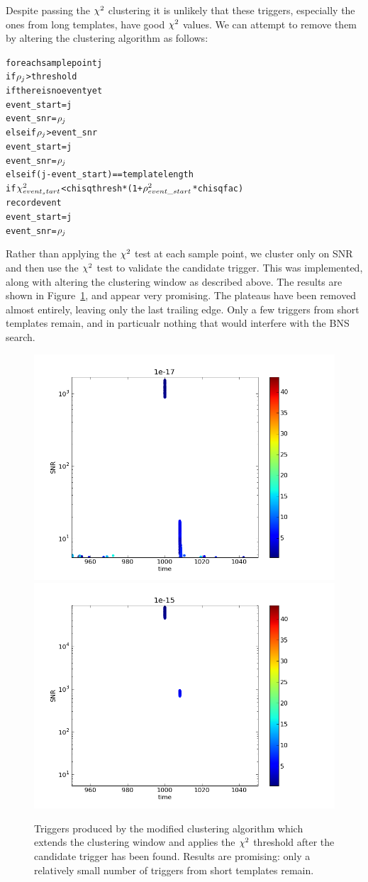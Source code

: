 Despite passing the $\chi^2$ clustering it is unlikely that these
triggers, especially the ones from long templates, have good $\chi^2$
values.  We can attempt to remove them by altering the clustering
algorithm as follows:


\begin{alltt}
for each sample point j
  if \(\rho\sb{j}\) > threshold
    if there is no event yet
      event\_start = j
      event\_snr   = \(\rho\sb{j}\)
    else if \(\rho\sb{j}\) > event\_snr
      event\_start = j
      event\_snr = \(\rho\sb{j}\)
    else if (j - event\_start) == template length
      if \(\chisq\sb{event_start}\) < chisq thresh * ( 1 + \(\rho\sp{2}\sb{event\_start}\) * chisqfac )
        record event
      event\_start = j
      event\_snr   = \(\rho\sb{j}\)
\end{alltt}

Rather than applying the $\chi^2$ test at each sample point, we
cluster only on SNR and then use the $\chi^2$ test to validate the 
candidate trigger.  This was implemented, along with altering the
clustering window as described above.  The results are shown in
Figure~\ref{f:impulses_new_chisq}, and appear very promising.  The
plateaus have been removed almost entirely, leaving only the last
trailing edge.  Only a few triggers from short templates remain, and
in particualr nothing that would interfere with the BNS search.

\begin{figure}
  \includegraphics[width=0.5\linewidth]{figures/detchar/1e-17_fixed_20100909}
  \includegraphics[width=0.5\linewidth]{figures/detchar/1e-15_fixed_20100909}
  \caption[Triggers produced by modified clustering algorithm] {
  \label{f:impulses_new_chisq}
Triggers produced by the modified clustering algorithm which extends
the clustering window and applies the $\chi^2$  threshold after the
candidate trigger has been found.  Results are promising: only a
relatively small number of triggers from short templates remain.
}
\end{figure}%

